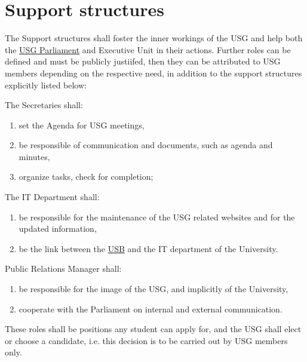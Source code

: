 \section{Support structures} 
\label{suppstrucdef}
The Support structures shall foster the inner workings of the USG and help both the \hyperref[USGParliamentDef]{USG Parliament} and Executive Unit in their actions. Further roles can be defined and must be publicly justiifed, then they can be attributed to USG members depending on the respective need, in addition to the support structures explicitly listed below:
\begin{parenum}
\item The Secretaries shall:
\begin{enumerate}
\item set the Agenda for USG meetings,
\item be responsible of communication and documents, such as agenda and minutes,
\item organize tasks, check for completion;
\end{enumerate}

\item The IT Department shall:
\begin{enumerate}
\item be responsible for the maintenance of the USG related websites and for the updated information,
\item be the link between the \hyperref[studentbody]{USB} and the IT department of the University.
\end{enumerate}

\item Public Relations Manager shall:
\begin{enumerate}
    \item be responsible for the image of the USG, and implicitly of the University, 
    \item cooperate with the Parliament on internal and external communication.
\end{enumerate}

\end{parenum}
These roles shall be positions any student can apply for, and the USG shall elect or choose a candidate, i.e. this decision is to be carried out by USG members only.